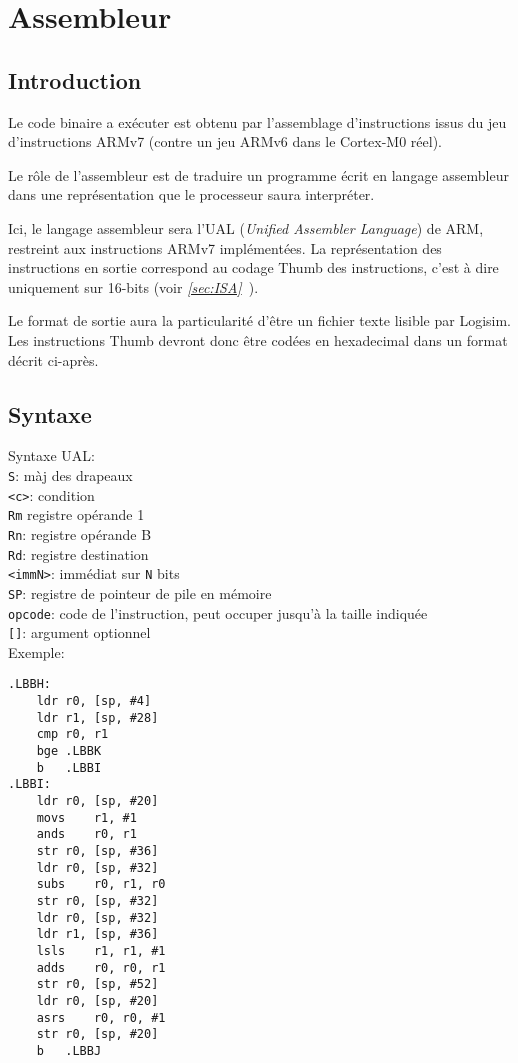 \section{Assembleur}

\subsection{Introduction}

	Le code binaire a exécuter est obtenu par l'assemblage d'instructions issus du jeu d'instructions ARMv7 (contre un jeu ARMv6 dans le Cortex-M0 réel).

Le rôle de l'assembleur est de traduire un programme écrit en langage assembleur dans une représentation que le processeur saura interpréter.

Ici, le langage assembleur sera l'UAL (\textit{Unified Assembler Language}) de ARM, restreint aux instructions ARMv7 implémentées.
La représentation des instructions en sortie correspond au codage Thumb des instructions, c'est à dire uniquement sur 16-bits (voir \textit{\ref{sec:ISA}~}).

Le format de sortie aura la particularité d'être un fichier texte lisible par Logisim. Les instructions Thumb devront donc être codées en hexadecimal dans un format décrit ci-après.

\subsection{Syntaxe}
Syntaxe UAL:\\
\texttt{S}: màj des drapeaux\\
\texttt{<c>}: condition\\
\texttt{Rm} registre opérande 1\\
\texttt{Rn}: registre opérande B\\
\texttt{Rd}: registre destination\\
\texttt{<immN>}: immédiat sur \texttt{N} bits\\
\texttt{SP}: registre de pointeur de pile en mémoire\\
\texttt{opcode}: code de l'instruction, peut occuper jusqu'à la taille indiquée\\
\texttt{[]}: argument optionnel\\

Exemple:
\begin{lstlisting}
.LBBH:                                
	ldr	r0, [sp, #4]
	ldr	r1, [sp, #28]
	cmp	r0, r1
	bge	.LBBK
	b	.LBBI
.LBBI:                                
	ldr	r0, [sp, #20]
	movs	r1, #1
	ands	r0, r1
	str	r0, [sp, #36]
	ldr	r0, [sp, #32]
	subs	r0, r1, r0
	str	r0, [sp, #32]
	ldr	r0, [sp, #32]
	ldr	r1, [sp, #36]
	lsls	r1, r1, #1
	adds	r0, r0, r1
	str	r0, [sp, #52]
	ldr	r0, [sp, #20]
	asrs	r0, r0, #1
	str	r0, [sp, #20]
	b	.LBBJ
\end{lstlisting}

